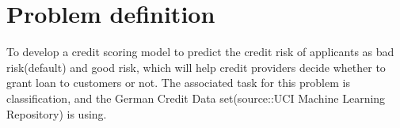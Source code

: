 \documentclass{article}\usepackage[]{graphicx}\usepackage[]{color}
\begin{document}



\section{Problem definition}\hspace{0.5cm}To develop a credit scoring model to predict the credit risk of applicants as bad risk(default) and good risk, which will help credit providers decide whether to grant loan to customers or not. The associated task for this problem is classification, and the German Credit Data set(source::UCI Machine Learning Repository) \cite{[2]} is using.
\end{document}
